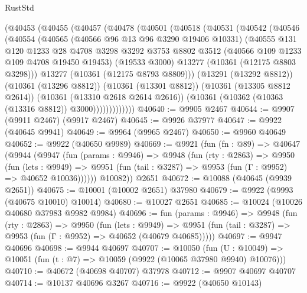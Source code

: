 \begin{lexlean}{RustStd}
\begin{coremodule}
      (@40453
        (@40455
          (@40457
            (@40478
              (@40501
                (@40518
                  (@40531
                    (@40542
                      (@40546
                        (@40554
                          (@40565
                            (@40566 @96 @13 @96 @3290 @19406 @10331)
                            (@40555
                              @131
                              @120
                              @1233
                              @28
                              @4708
                              @3298
                              @3292
                              @3753
                              @8802
                              @3512
                              (@40566 @109 @1233 @109 @4708 @19450 @19453)
                              (@19533 @3000)
                              @13277
                              (@10361 (@12175 @8803 @3298)))
                            @13277
                            (@10361 (@12175 @8793 @8809)))
                          (@13291 (@13292 @8812))
                          (@10361 (@13296 @8812))
                          (@10361 (@13301 @8812))
                          (@10361 (@13305 @8812 @2614))
                          (@10361 (@13310 @2618 @2614 @2616))
                          (@10361 (@10362 (@10363 (@13316 @8812)) @3000)))))))))))))
@40640 := @9905 @2467
@40644 := @9907 (@9911 @2467) (@9917 @2467)
@40645 := @9926 @37977
@40647 := @9922 (@40645 @9941)
@40649 := @9964 (@9965 @2467)
@40650 := @9960 @40649
@40652 := @9922 (@40650 @9989)
@40669 := @9921
    (fun (fn : @89) =>
    @40647
      (@9944
        (@9947
          (fun (params : @9946) =>
          @9948
            (fun (rty : @2863) =>
            @9950
              (fun (lets : @9949) =>
              @9951 (fun (tail : @3287) => @9953 (fun (Γ : @9952) => @40652 @10036))))))
        @10082))
    @2651
@40672 := @10088 (@40645 (@9939 @2651))
@40675 := @10001 (@10002 @2651) @37980
@40679 := @9922 (@9993 (@40675 @10010) @10014)
@40680 := @10027 @2651
@40685 := @10024 (@10026 @40680 @37983 @9982 @9984)
@40696 := fun (params : @9946) =>
  @9948
    (fun (rty : @2863) =>
    @9950
      (fun (lets : @9949) =>
      @9951 (fun (tail : @3287) => @9953 (fun (Γ : @9952) => @40652 (@40679 @40685)))))
@40697 := @9947 @40696
@40698 := @9944 @40697
@40707 := @10050
    (fun (U : @10049) => @10051 (fun (t : @7) => @10059 (@9922 (@10065 @37980 @9940) @10076)))
@40710 := @40672 (@40698 @40707) @37978
@40712 := @9907 @40697 @40707
@40714 := @10137 @40696 @3267
@40716 := @9922 (@40650 @10143)

\end{coremodule}
\end{lexlean}
